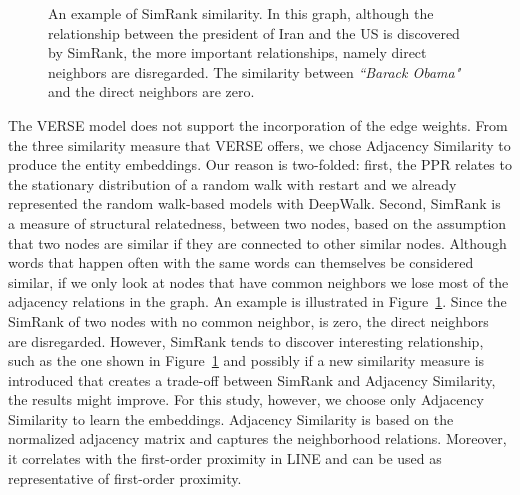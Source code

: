 \begin{figure}
\centering 
\resizebox{0.50\textwidth}{0.35\textwidth}{      

}
\caption{An example of SimRank similarity. In this graph, although the relationship between the president of Iran and the US is discovered by SimRank, the more important relationships, namely direct neighbors are disregarded. The similarity between \emph{``Barack Obama"} and the direct neighbors are zero.  }
\label{fig:simrank}
\end{figure}
The VERSE model does not support the incorporation of the edge weights. From the three similarity measure that VERSE offers, we chose Adjacency Similarity to produce the entity embeddings. Our reason is two-folded: first, the PPR relates to the stationary distribution of a random walk with restart and we already represented the random walk-based models with DeepWalk. Second, SimRank is a measure of structural relatedness, between two nodes, based on the assumption that two nodes are
similar if they are connected to other similar nodes. Although words that happen often with the same words can themselves be considered similar, if we only look at nodes that have common neighbors we lose most of the adjacency relations in the graph. An example is illustrated in Figure~\ref{fig:simrank}. Since the SimRank of two nodes with no common neighbor, is zero, the direct neighbors are disregarded. However, SimRank tends to discover interesting relationship, such as the one shown in Figure~\ref{fig:simrank} and possibly if a new similarity measure is introduced that creates a trade-off between SimRank and Adjacency Similarity, the results might improve. For this study, however, we choose only Adjacency Similarity to learn the embeddings. Adjacency Similarity is based on the normalized adjacency matrix and captures the neighborhood relations. Moreover, it correlates with the first-order proximity in LINE and can be used as representative of first-order proximity. \\
